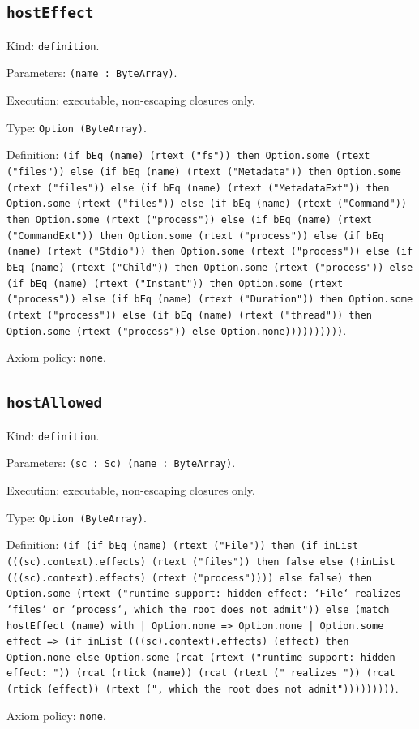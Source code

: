 \documentclass[11pt]{article}
\begin{document}
\subsection*{\texttt{hostEffect}}
\noindent Kind: \texttt{definition}.\par
\noindent Parameters: \texttt{(name : ByteArray)}.\par
\noindent Execution: executable, non-escaping closures only.\par
\noindent Type: \texttt{Option (ByteArray)}.\par
\noindent Definition: \texttt{(if bEq (name) (rtext ("fs")) then Option.some (rtext ("files")) else (if bEq (name) (rtext ("Metadata")) then Option.some (rtext ("files")) else (if bEq (name) (rtext ("MetadataExt")) then Option.some (rtext ("files")) else (if bEq (name) (rtext ("Command")) then Option.some (rtext ("process")) else (if bEq (name) (rtext ("CommandExt")) then Option.some (rtext ("process")) else (if bEq (name) (rtext ("Stdio")) then Option.some (rtext ("process")) else (if bEq (name) (rtext ("Child")) then Option.some (rtext ("process")) else (if bEq (name) (rtext ("Instant")) then Option.some (rtext ("process")) else (if bEq (name) (rtext ("Duration")) then Option.some (rtext ("process")) else (if bEq (name) (rtext ("thread")) then Option.some (rtext ("process")) else Option.none))))))))))}.\par
\noindent Axiom policy: \texttt{none}.\par
\subsection*{\texttt{hostAllowed}}
\noindent Kind: \texttt{definition}.\par
\noindent Parameters: \texttt{(sc : Sc) (name : ByteArray)}.\par
\noindent Execution: executable, non-escaping closures only.\par
\noindent Type: \texttt{Option (ByteArray)}.\par
\noindent Definition: \texttt{(if (if bEq (name) (rtext ("File")) then (if inList (((sc).context).effects) (rtext ("files")) then false else (!inList (((sc).context).effects) (rtext ("process")))) else false) then Option.some (rtext ("runtime support: hidden-effect: `File` realizes `files` or `process`, which the root does not admit")) else (match hostEffect (name) with | Option.none => Option.none | Option.some effect => (if inList (((sc).context).effects) (effect) then Option.none else Option.some (rcat (rtext ("runtime support: hidden-effect: ")) (rcat (rtick (name)) (rcat (rtext (" realizes ")) (rcat (rtick (effect)) (rtext (", which the root does not admit")))))))))}.\par
\noindent Axiom policy: \texttt{none}.\par
\end{document}
